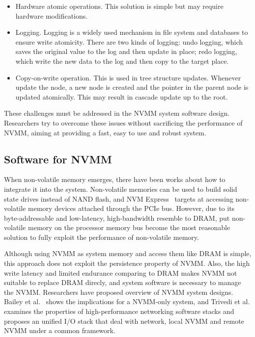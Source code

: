 \begin{itemize}
\item Hardware atomic operations. This solution is simple but may require
hardware modifications.
\item Logging. Logging is a widely used mechanism in file system and databases
to ensure write atomicity. There are two kinds of logging: undo logging, which
saves the original value to the log and then update in place; redo logging,
which write the new data to the log and then copy to the target place.
\item Copy-on-write operation. This is used in tree structure updates. Whenever
update the node, a new node is created and the pointer in the parent node is
updated atomically. This may result in cascade update up to the root.
\end{itemize}

These challenges must be addressed in the NVMM system software design.
Researchers try to overcome these issues without sacrificing the performance
of NVMM, aiming at providing a fast, easy to use and robust system.

\subsection{Software for NVMM}
\label{sec:NVMM}


When non-volatile memory emerges, there have been works about how to
integrate it into the system. Non-volatile memories can be used to build solid
state drives
instead of NAND flash, and NVM Express~\cite{NVMe} targets at accessing
non-volatile memory devices attached through the PCIe bus. However, due to
its byte-addressable and low-latency, high-bandwidth resemble to DRAM,
put non-volatile memory on the processor memory bus become the most reasonable
solution to fully exploit the performance of non-volatile memory.

Although using NVMM as system memory and access them like DRAM is simple,
this approach does not exploit the persistence property of NVMM. Also, the
high write latency and limited endurance comparing to DRAM makes NVMM not
suitable to replace DRAM direcly, and system software is necessary to
manage the NVMM. Researchers have proposed overview of NVMM system designs.
Bailey et al.~\cite{systemimplications} shows the implications for a NVMM-only
system, and Trivedi et al.\cite{onestack}  examines the
properties of high-performance networking software stacks 
and proposes an unified I/O stack that deal with
network, local NVMM and remote NVMM under a common framework.

